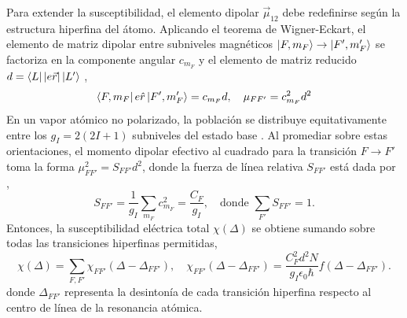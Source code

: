 Para extender la susceptibilidad, el elemento dipolar $\vec{\mu}_{12}$ debe redefinirse según la estructura hiperfina del átomo. Aplicando el teorema de Wigner-Eckart, el elemento de matriz dipolar entre subniveles magnéticos $\ket{F, m_F} \to \ket{F', m_F'}$ se factoriza en la componente angular $c_{m_F}$ y el elemento de matriz reducido $d = \bra{L}\lvert e\vec{r} \rvert \ket{L'}$ \cite{edmondsAngularMomentumQuantum1996, thompsonAngularMomentumIllustrated2008},
\begin{equation*}
    \bra{F,m_F} e \hat{r} \ket{F', m_F'} = c_{m_F} d, \quad \mu_{FF'} = c_{m_F}^2 d^2
\end{equation*}
En un vapor atómico no polarizado, la población se distribuye equitativamente entre los $g_I = 2(2I+1)$ subniveles del estado base \cite{footAtomicPhysics2005}. Al promediar sobre estas orientaciones, el momento dipolar efectivo al cuadrado para la transición $F \to F'$ toma la forma $\mu_{FF'}^2 = S_{FF'} d^2$, donde la fuerza de línea relativa $S_{FF'}$ está dada por \cite{zentileElecSusProgramCalculate2015},
\begin{equation*}
    S_{F F'} = \frac{1}{g_I} \sum_{m_F} c_{m_F}^2 = \frac{C_F}{g_I}, \quad \text{donde } \sum_{F'} S_{FF'} = 1.
\end{equation*}
Entonces, la susceptibilidad eléctrica total $\chi(\Delta)$ se obtiene sumando sobre todas las transiciones hiperfinas permitidas,
\begin{equation}
    \chi(\Delta) = \sum_{F, F'} \chi_{FF'}(\Delta-\Delta_{FF'}),\quad \chi_{FF'}(\Delta-\Delta_{FF'})= \frac{C_F^2 d^2 N}{g_I \epsilon_0 \hbar} f(\Delta - \Delta_{FF'}).
\end{equation}
donde $\Delta_{FF'}$ representa la desintonía de cada transición hiperfina respecto al centro de línea de la resonancia atómica.
